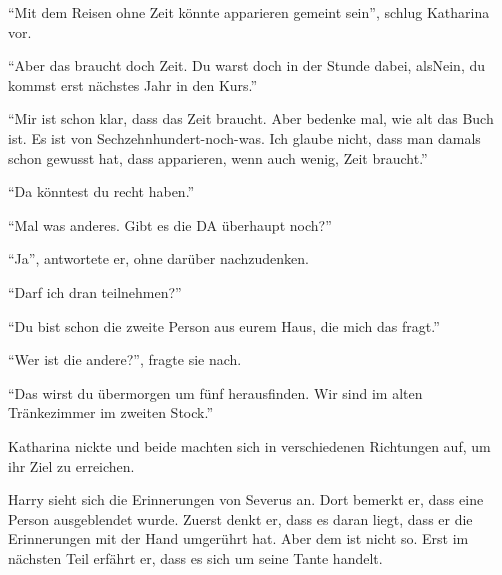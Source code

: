 \enquote{Mit dem Reisen ohne Zeit könnte apparieren gemeint sein}, schlug Katharina vor.

\enquote{Aber das braucht doch Zeit. Du warst doch in der Stunde dabei, als\abs Nein, du kommst erst nächstes Jahr in den Kurs.}

\enquote{Mir ist schon klar, dass das Zeit braucht. Aber bedenke mal, wie alt das Buch ist. Es ist von Sechzehnhundert-noch-was. Ich glaube nicht, dass man damals schon gewusst hat, dass apparieren, wenn auch wenig, Zeit braucht.}

\enquote{Da könntest du recht haben.}

\enquote{Mal was anderes. Gibt es die DA überhaupt noch?}

\enquote{Ja}, antwortete er, ohne darüber nachzudenken.

\enquote{Darf ich dran teilnehmen?}

\enquote{Du bist schon die zweite Person aus eurem Haus, die mich das fragt.}

\enquote{Wer ist die andere?}, fragte sie nach.

\enquote{Das wirst du übermorgen um fünf herausfinden. Wir sind im alten Tränkezimmer im zweiten Stock.}

Katharina nickte und beide machten sich in verschiedenen Richtungen auf, um ihr Ziel zu erreichen.




\begin{kommentar}
Harry sieht sich die Erinnerungen von Severus an. Dort bemerkt er, dass eine Person ausgeblendet wurde. Zuerst denkt er, dass es daran liegt, dass er die Erinnerungen mit der Hand umgerührt hat. Aber dem ist nicht so. Erst im nächsten Teil erfährt er, dass es sich um seine Tante handelt.
\end{kommentar}
